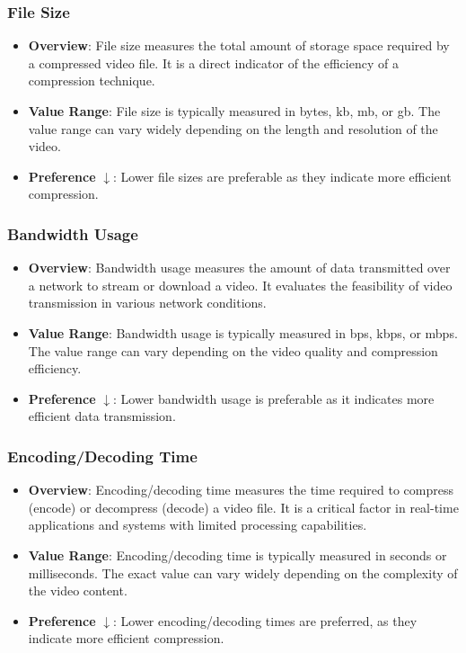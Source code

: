         \subsubsection{File Size}
            \begin{itemize}
                \item \textbf{Overview}: File size measures the total amount of storage space required by a compressed video file. It is a direct indicator of the efficiency of a compression technique.
                \item \textbf{Value Range}: File size is typically measured in bytes, \gls{kb}, \gls{mb}, or \gls{gb}. The value range can vary widely depending on the length and resolution of the video.
                \item \textbf{Preference} $\downarrow$: Lower file sizes are preferable as they indicate more efficient compression.
            \end{itemize}

        \subsubsection{Bandwidth Usage}
            \begin{itemize}
                \item \textbf{Overview}: Bandwidth usage measures the amount of data transmitted over a network to stream or download a video. It evaluates the feasibility of video transmission in various network conditions.
                \item \textbf{Value Range}:  Bandwidth usage is typically measured in \gls{bps}, \gls{kbps}, or \gls{mbps}. The value range can vary depending on the video quality and compression efficiency.
                \item \textbf{Preference} $\downarrow$: Lower bandwidth usage is preferable as it indicates more efficient data transmission.
            \end{itemize}

        \subsubsection{Encoding/Decoding Time}
        \begin{itemize}
            \item \textbf{Overview}: Encoding/decoding time measures the time required to compress (encode) or decompress (decode) a video file. It is a critical factor in real-time applications and systems with limited processing capabilities.
            \item \textbf{Value Range}: Encoding/decoding time is typically measured in seconds or milliseconds. The exact value can vary widely depending on the complexity of the video content.
            \item \textbf{Preference} $\downarrow$: Lower encoding/decoding times are preferred, as they indicate more efficient compression.
        \end{itemize}
